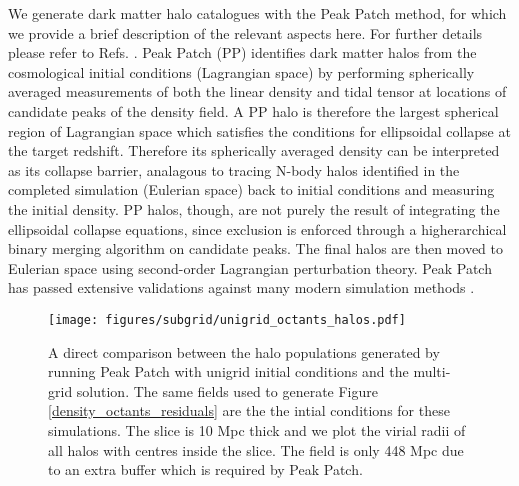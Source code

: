 We generate dark matter halo catalogues with the Peak Patch method, for which we provide a brief description of the relevant aspects here. For further details please refer to Refs. \citep{peakpatch1,peakpatch2,peakpatch3}. Peak Patch (PP) identifies dark matter halos from the cosmological initial conditions (Lagrangian space) by performing spherically averaged measurements of both the linear density and tidal tensor at locations of candidate peaks of the density field. A PP halo is therefore the largest spherical region of Lagrangian space which satisfies the conditions for ellipsoidal collapse at the target redshift. Therefore its spherically averaged density can be interpreted as its collapse barrier, analagous to tracing N-body halos identified in the completed simulation (Eulerian space) back to initial conditions and measuring the initial density. PP halos, though, are not purely the result of integrating the ellipsoidal collapse equations, since exclusion is enforced through a higherarchical binary merging algorithm on candidate peaks. The final halos are then moved to Eulerian space using second-order Lagrangian perturbation theory. Peak Patch has passed extensive validations against many modern simulation methods \cite{euclidcp1, euclidcp2, euclidcp3}.

\begin{figure} %
\begin{center}
\texttt{[image: figures/subgrid/unigrid\_octants\_halos.pdf]}%
\caption{A direct comparison between the halo populations generated by running Peak Patch with unigrid initial conditions and the multi-grid solution. The same fields used to generate Figure \ref{density_octants_residuals} are the the intial conditions for these simulations. The slice is 10 Mpc thick and we plot the virial radii of all halos with centres inside the slice. The field is only 448 Mpc due to an extra buffer which is required by Peak Patch. }
\label{halo_comparison}
\end{center}
\end{figure}

